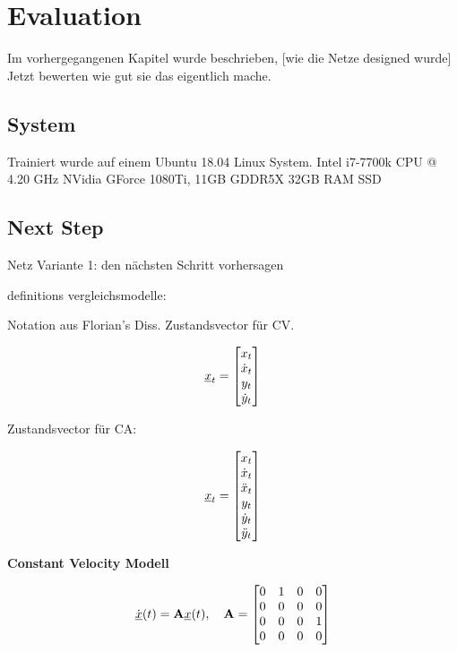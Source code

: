 \chapter{Evaluation}

Im vorhergegangenen Kapitel wurde beschrieben, [wie die Netze designed wurde]
Jetzt bewerten wie gut sie das eigentlich mache.

\section{System}

Trainiert wurde auf einem Ubuntu 18.04 Linux System.
Intel i7-7700k CPU @ 4.20 GHz 
NVidia GForce 1080Ti, 11GB GDDR5X
32GB RAM
SSD 


\section{Next Step}

Netz Variante 1: den nächsten Schritt vorhersagen


definitions vergleichsmodelle:

Notation aus Florian's Diss. Zustandsvector für CV.


\begin{equation*} \label{eq:definitionCV}
    {\underline{x}}_t = 
    \begin{bmatrix}
        x_t \\
        \dot{x}_t \\
        y_t \\
        \dot{y}_t
       \end{bmatrix} 
\end{equation*}


Zustandsvector für CA:

\begin{equation*} \label{eq:definitionCA}
    {\underline{x}}_t = 
    \begin{bmatrix}
        x_t \\
        \dot{x}_t \\
        \ddot{x}_t \\
        y_t \\
        \dot{y}_t \\
        \ddot{y}_t
       \end{bmatrix} 
\end{equation*}


\textbf{Constant Velocity Modell}

\begin{equation*} \label{eq:speedCV}
    \dot{{\underline{x}}}(t) = {{\mathbf{A}}}{\underline{x}}(t), \quad {\ensuremath{{\mathbf{A}}}} = 
    \begin{bmatrix}
        0 & 1 & 0 & 0 \\
        0 & 0 & 0 & 0 \\
        0 & 0 & 0 & 1\\
        0 & 0 & 0 & 0
    \end{bmatrix} 
\end{equation*}



